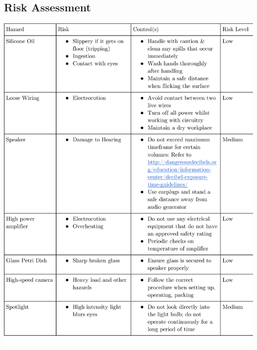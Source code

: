 \documentclass[12pt, journal, transmag, onecolumn]{IEEEtran}
\begin{document}
\clearpage



\clearpage


\clearpage


\clearpage


\begin{appendices}



\clearpage


\clearpage


\clearpage



\clearpage



\clearpage



\clearpage



\clearpage



\clearpage




\section{Risk Assessment}
\includegraphics[width=\textwidth]{prototype/riskassessment.pdf}
\clearpage


\end{appendices}
\end{document}
